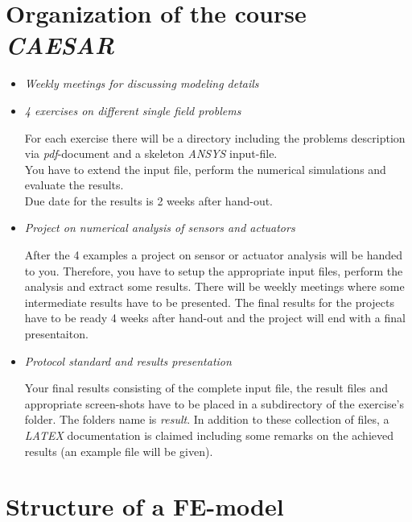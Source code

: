 \section{Organization of the course {\em CAESAR}}
%
\begin{itemize}
%
\item {\em Weekly meetings for discussing modeling details}\\
\item {\em 4 exercises on different single field problems}\\
\begin{print}
For each exercise there will be a directory including the problems description via {\em pdf}-document and a skeleton {\em ANSYS} input-file.\\
You have to extend the input file, perform the numerical simulations and evaluate the results.\\ 
Due date for the results is 2 weeks after hand-out.\\
\end{print}
\item {\em Project on numerical analysis of sensors and actuators}\\
\begin{print}
After the 4 examples a project on sensor or actuator analysis will be handed to you. Therefore, you have to setup the appropriate input files, perform the analysis and extract some results. There will be weekly meetings where some intermediate results have to be presented. The final results for the projects have to be ready 4 weeks after hand-out and the project will end with a final presentaiton.  
\end{print}
\item {\em Protocol standard and results presentation}\\
\begin{print}
Your final results consisting of the complete input file, the result files and appropriate screen-shots have to be placed in a subdirectory of the exercise's folder. The folders name is {\em result}. In addition to these collection of files, a {\em LATEX} documentation is claimed including some remarks on the achieved results (an example file will be given). 
\end{print}
%
\end{itemize}
%
\newslide
%
\section{Structure of a FE-model}
%
%
\newslide
%
